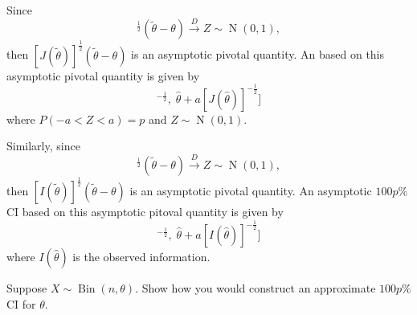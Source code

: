 \documentclass[notoc,notitlepage]{tufte-book}
\DeclareMathOperator{\Bin}{Bin }
\DeclareMathOperator{\Nor}{N }
\newcommand{\convd}{\overset{D}{\to}}
\begin{document}
\begin{propo}
\label{propo:asymptotic_confidence_intervals}
Since
  \begin{equation*}
    [J(\tilde{\theta})]^{\frac{1}{2}} (\tilde{\theta} - \theta) \convd Z \sim \Nor(0, 1),
  \end{equation*}
  then $[J(\tilde{\theta})]^{\frac{1}{2}} (\tilde{\theta} - \theta)$ is an asymptotic pivotal quantity. An  based on this asymptotic pivotal quantity is given by
  \begin{equation*}
    [ \hat{\theta} - a[J(\hat{\theta})]^{-\frac{1}{2}}, \; \hat{\theta} + a[J(\hat{\theta})]^{-\frac{1}{2}} ]
  \end{equation*}
  where $P(-a < Z < a) = p$ and $Z \sim \Nor(0, 1)$.
\end{propo}

\begin{note}
  Similarly, since
  \begin{equation*}
    [I(\tilde{\theta})]^{\frac{1}{2}} (\tilde{\theta} - \theta) \convd Z \sim \Nor(0, 1),
  \end{equation*}
  then $[I(\tilde{\theta})]^{\frac{1}{2}} (\tilde{\theta} - \theta)$ is an asymptotic pivotal quantity. An asymptotic $100p\%$ CI based on this asymptotic pitoval quantity is given by
  \begin{equation*}
    [ \hat{\theta} - a[I(\hat{\theta})]^{-\frac{1}{2}}, \; \hat{\theta} + a[I(\hat{\theta})]^{-\frac{1}{2}} ]
  \end{equation*}
  where $I(\hat{\theta})$ is the observed information.
\end{note}

\begin{eg}[Example 6.22]
  Suppose $X \sim \Bin(n, \theta)$. Show how you would construct an approximate $100p\%$ CI for $\theta$.\end{eg}
\end{document}
